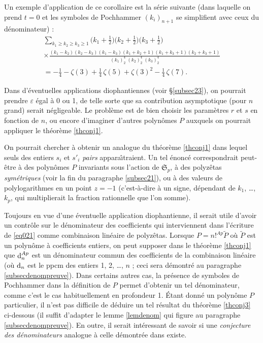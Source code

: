 \documentclass[12pt,francais, reqno]{smfart}
\numberwithin{equation}{section}
\newcommand{\dd}{\textup{d}}
\def\dd{\textup{d}}
\newcommand{\spp}{{\mathfrak S}_p}
\newcommand{\eps}{\varepsilon}
\begin{document}
Un  exemple d'application de ce corollaire est la s\'erie suivante (dans laquelle on prend $t=0$ et les symboles de Pochhammer $(k_i)_{n+1}$ se simplifient avec ceux du d\'enominateur) : 
\begin{multline}\label{eq:exempleinteressant}
\sum_{k_1\ge k_2\ge k_3\ge 1}\big(k_1+\frac12\big)\big(k_2+ \frac12\big)\big(k_3+\frac12\big) 
\\
\times \frac{(k_1-k_2)(k_2-k_3)(k_1-k_3)
(k_1+k_2+1)(k_1+k_3+1)(k_2+k_3+1)}{(k_1)_2^4\;(k_2)_2^4\;(k_3)_2^4}
\\
= -\frac{1}{4} - \zeta(3) + \frac14 \,\zeta(5) + \zeta(3)^2 -\frac14 \,\zeta(7).
\end{multline}

\medskip

Dans d'\'eventuelles applications diophantiennes (voir \S \ref{subsec23}), on pourrait prendre $\eps$   \'egal \`a 0 ou 1, de telle sorte que sa contribution asymptotique (pour $n$ grand) serait n\'egligeable. Le probl\`eme est de bien choisir les param\`etres $r$ et $s$ en fonction de $n$, ou encore d'imaginer d'autres 
polyn\^omes $P$ auxquels on pourrait appliquer le th\'eor\`eme \ref{thconj1}.

\bigskip

On pourrait chercher \`a obtenir un analogue du th\'eor\`eme \ref{thconj1} dans lequel seuls des entiers $s_i$ et $s'_i$ {\em pairs} appara\^{\i}traient. Un tel \'enonc\'e correspondrait peut-\^etre \`a des polyn\^omes $P$ invariants sous l'action de $\spp$, \`a des polyz\^etas {\em sym\'etriques} (voir la fin du paragraphe \ref{subsec21}), ou \`a des valeurs de polylogarithmes en un point $z  = -1$ (c'est-\`a-dire \`a un signe, d\'ependant de $k_1$, \ldots, $k_p$,  qui multiplierait la fraction rationnelle que l'on somme). 

\bigskip

 
Toujours en vue d'une \'eventuelle application diophantienne, 
il serait utile d'avoir 
un contr\^ole sur le d\'enominateur des coefficients qui interviennent dans l'\'ecriture de \eqref{eq021} comme combinaison lin\'eaire de polyz\^etas. Lorsque  $P = n!^{Ap} \widetilde P $ o\`u $\widetilde P $ est un polyn\^ome \`a coefficients entiers, on peut supposer dans le th\'eor\`eme \ref{thconj1} que  $\dd_n ^{Ap}$ est un d\'enominateur commun des coefficients de la combinaison lin\'eaire (o\`u $\dd_n$ est le ppcm des entiers 1, 2, \ldots, $n$ ; ceci sera d\'emontr\'e au paragraphe \ref{subsecdenompreuve}). Dans certains autres cas, la pr\'esence de symboles de Pochhammer dans la d\'efinition de $P$ permet d'obtenir un tel d\'enominateur, comme c'est le cas habituellement en profondeur 1. \'Etant donn\'e un polyn\^ome $P$ particulier, il n'est pas difficile  de d\'eduire un tel r\'esultat  du th\'eor\`eme  \ref{thconj3} ci-dessous (il suffit d'adapter le lemme \ref{lemdenom} qui figure au paragraphe \ref{subsecdenompreuve}). En outre, il serait int\'eressant de savoir si une {\em conjecture des d\'enominateurs} analogue \`a celle d\'emontr\'ee dans \cite{KR} existe.
 
\end{document}
